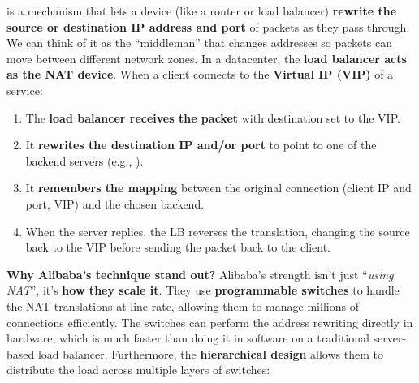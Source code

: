 \highspace
{} is a mechanism that lets a device (like a router or load balancer) \textbf{rewrite the source or destination IP address and port} of packets as they pass through. We can think of it as the ``middleman'' that changes addresses so packets can move between different network zones. In a datacenter, the \textbf{load balancer acts as the NAT device}. When a client connects to the \textbf{Virtual IP (VIP)} of a service:
\begin{enumerate}
    \item The \textbf{load balancer receives the packet} with destination set to the VIP.
    \item It \textbf{rewrites the destination IP and/or port} to point to one of the backend servers (e.g., ).
    \item It \textbf{remembers the mapping} between the original connection (client IP and port, VIP) and the chosen backend.
    \item When the server replies, the LB reverses the translation, changing the source back to the VIP before sending the packet back to the client.
\end{enumerate}
\textcolor{Green3}{ \textbf{Why Alibaba's technique stand out?}} Alibaba's strength isn't just ``\emph{using NAT}'', it's \textbf{how they scale it}. They use \textbf{programmable switches} to handle the NAT translations at line rate, allowing them to manage millions of connections efficiently. The switches can perform the address rewriting directly in hardware, which is much faster than doing it in software on a traditional server-based load balancer. Furthermore, the \textbf{hierarchical design} allows them to distribute the load across multiple layers of switches:
